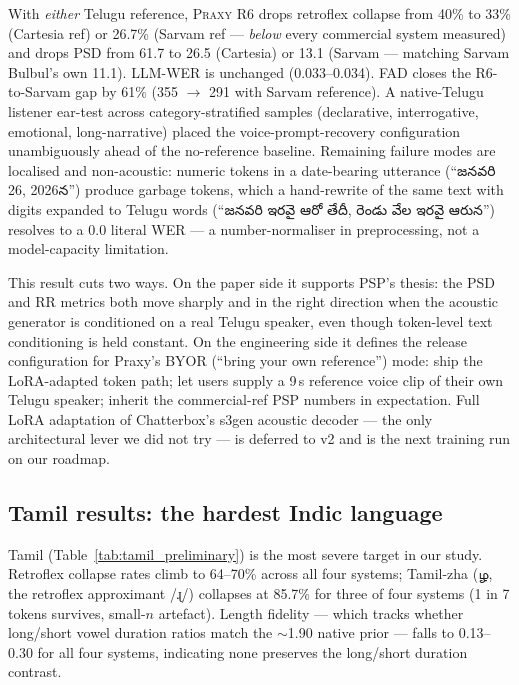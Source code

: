 \documentclass[conference,a4paper]{IEEEtran}
\newif\iftelugufontok\telugufontokfalse
\newif\iftamilfontok\tamilfontokfalse
\newcommand{\textte}[1]{\iftelugufontok{\telugufont #1}\else#1\fi}
\newcommand{\textta}[1]{\iftamilfontok{\tamilfont #1}\else#1\fi}
\newcommand{\praxy}{\textsc{Praxy}}
\begin{document}
With \emph{either} Telugu reference, \praxy{} R6 drops retroflex collapse from 40\% to 33\% (Cartesia ref) or 26.7\% (Sarvam ref --- \emph{below} every commercial system measured) and drops PSD from 61.7 to 26.5 (Cartesia) or 13.1 (Sarvam --- matching Sarvam Bulbul's own 11.1). LLM-WER is unchanged (0.033--0.034). FAD closes the R6-to-Sarvam gap by 61\% (355 $\to$ 291 with Sarvam reference). A native-Telugu listener ear-test across category-stratified samples (declarative, interrogative, emotional, long-narrative) placed the voice-prompt-recovery configuration unambiguously ahead of the no-reference baseline. Remaining failure modes are localised and non-acoustic: numeric tokens in a date-bearing utterance (``\textte{జనవరి} 26, 2026\textte{న}'') produce garbage tokens, which a hand-rewrite of the same text with digits expanded to Telugu words (``\textte{జనవరి ఇరవై ఆరో తేదీ, రెండు వేల ఇరవై ఆరున}'') resolves to a 0.0 literal WER --- a number-normaliser in preprocessing, not a model-capacity limitation.

This result cuts two ways. On the paper side it supports PSP's thesis: the PSD and RR metrics both move sharply and in the right direction when the acoustic generator is conditioned on a real Telugu speaker, even though token-level text conditioning is held constant. On the engineering side it defines the release configuration for Praxy's BYOR (``bring your own reference'') mode: ship the LoRA-adapted token path; let users supply a 9\,s reference voice clip of their own Telugu speaker; inherit the commercial-ref PSP numbers in expectation. Full LoRA adaptation of Chatterbox's s3gen acoustic decoder --- the only architectural lever we did not try --- is deferred to v2 and is the next training run on our roadmap.

\subsection{Tamil results: the hardest Indic language}

Tamil (Table~\ref{tab:tamil_preliminary}) is the most severe target in our study. Retroflex collapse rates climb to 64--70\% across all four systems; Tamil-zha (\textta{ழ}, the retroflex approximant /ɻ/) collapses at 85.7\% for three of four systems (1 in 7 tokens survives, small-$n$ artefact). Length fidelity --- which tracks whether long/short vowel duration ratios match the $\sim$1.90 native prior --- falls to 0.13--0.30 for all four systems, indicating none preserves the long/short duration contrast.
\end{document}
